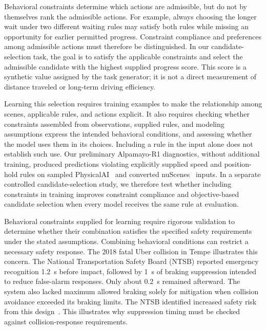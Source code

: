 Behavioral constraints determine which actions are admissible, but do not by
themselves rank the admissible actions. For example, always choosing the longer
wait under two different waiting rules may satisfy both rules while missing an
opportunity for earlier permitted progress. Constraint compliance and
preferences among admissible actions must therefore be distinguished. In our
candidate-selection task, the goal is to satisfy the applicable constraints
and select the admissible candidate with the highest supplied progress score.
This score is a synthetic value assigned by the task generator; it is not a
direct measurement of distance traveled or long-term driving efficiency.

Learning this selection requires training examples to make the relationship
among scenes, applicable rules, and actions explicit. It also requires checking
whether constraints assembled from observations, supplied rules, and modeling
assumptions express the intended behavioral conditions, and assessing whether
the model uses them in its choices. Including a rule in the input alone does
not establish such use. Our preliminary Alpamayo-R1 diagnostics, without
additional training, produced predictions violating explicitly supplied speed
and position-hold rules on sampled PhysicalAI~\cite{nvidia2025physicalai} and
converted nuScenes~\cite{caesar2020nuscenes} inputs. In a separate controlled
candidate-selection study, we therefore test whether including constraints in
training improves constraint compliance and objective-based candidate selection
when every model receives the same rule at evaluation.

Behavioral constraints supplied for learning require rigorous validation to
determine whether their combination satisfies the specified safety requirements
under the stated assumptions. Combining behavioral conditions can restrict a
necessary safety response. The 2018 fatal Uber collision in Tempe illustrates
this concern. The National Transportation Safety Board (NTSB) reported emergency
recognition 1.2~s before impact, followed by 1~s of braking suppression intended
to reduce false-alarm responses. Only about 0.2~s remained afterward. The system
also lacked maximum allowed braking solely for mitigation when collision
avoidance exceeded its braking limits. The NTSB identified increased safety
risk from this design~\cite{NTSB2019Tempe}. This illustrates why suppression
timing must be checked against collision-response requirements.

